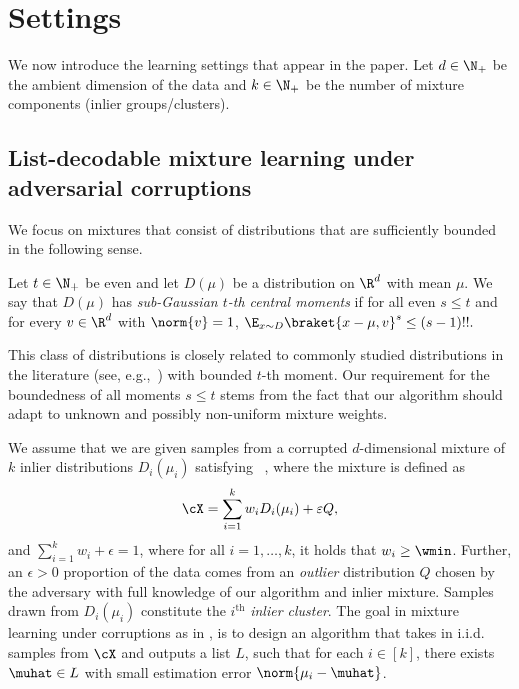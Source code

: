 \section{Settings}
\label{sec:prelims}
We now introduce the learning settings that appear in the paper.
Let \(d \in \N_+\) be the ambient dimension of the data and \(k \in \N_+\) be the number of mixture components (inlier groups/clusters). 
\subsection{List-decodable mixture learning under adversarial corruptions}
\label{sec:mixld}
We focus on mixtures that consist of distributions that are sufficiently bounded in the following sense.
\begin{definition}
\label{def:bounded}
    Let \(t \in \N_+\) be even and let \(D(\mu)\) be a distribution on \(\R^d\) with mean \(\mu\).
    We say that \(D(\mu)\) has \emph{sub-Gaussian \(t\)-th central moments} if for all even \(s \leq t\) and for every \(v \in \R^d\) with \(\norm{v} = 1\), \(\E_{x \sim D} \braket{x - \mu, v}^s \leq (s-1)!!.\)
\end{definition}
This class of distributions
is closely related to commonly studied distributions in the literature
(see, e.g.,~\cite{diakonikolas2023algorithmic}) with bounded 
 \(t\)-th moment. Our requirement for the boundedness of all moments \(s \leq t\) stems from the fact that our algorithm should adapt to unknown and possibly non-uniform mixture weights.

We assume that we are given samples from a corrupted $d$-dimensional mixture of $k$ inlier distributions \(D_i(\mu_i)\) satisfying ~, where the mixture is defined as
\begin{equation}
\label{eq:gen_model}
    \cX = \sum_{i=1}^k w_i D_i(\mu_i) + \varepsilon Q,
\end{equation}
and $\sum_{i=1}^k w_i + \epsilon = 1$, where for all $i = 1, \ldots, k$, it holds that $w_i \geq \wmin$. Further, an
$\epsilon>0$ proportion of the data comes from an \emph{outlier} distribution \(Q\)
chosen by the adversary with full knowledge of our algorithm and inlier mixture.
Samples drawn from \(D_i(\mu_i)\) constitute the \(i^{\mathrm{th}}\) \textit{inlier cluster}.
The goal in mixture learning under corruptions  as in , is to design an algorithm that takes in i.i.d. samples from $\cX$ and outputs a list $L$, such that for each \(i \in [k]\), there exists \(\muhat \in L\) with small estimation error \(\norm{\mu_i - \muhat}\).



